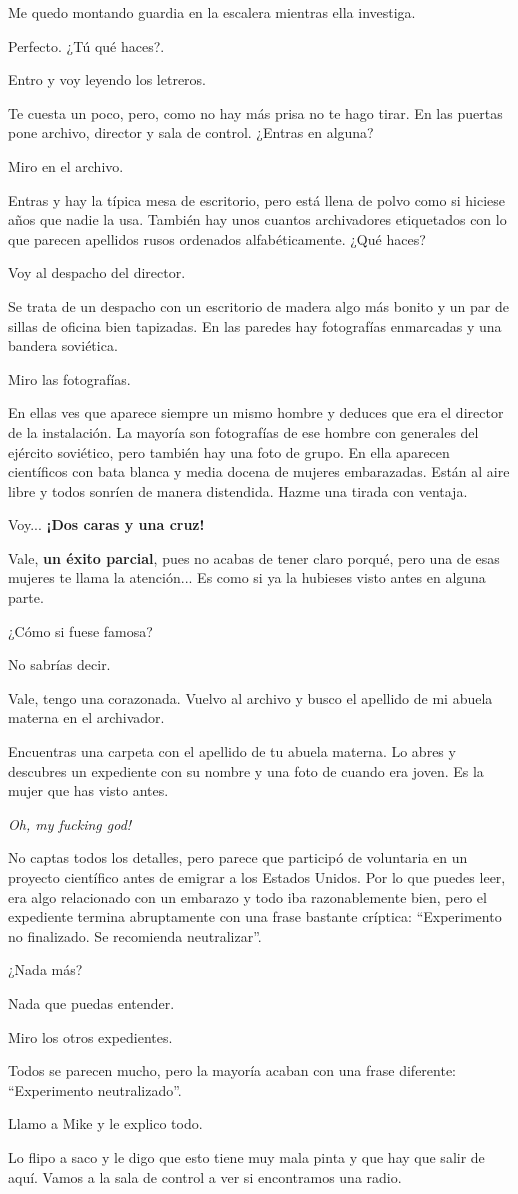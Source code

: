 \documentclass[10pt, a5paper, twocolumn]{article}
\newenvironment{dialogue}
    {\begin{description}[leftmargin=!,align=right,labelwidth=0.cm]}
    {\end{description}}
\newcommand\A{\item[\raisebox{-0.25em}{\scalebox{0.75}{\bctetraedre}}]}
\newcommand\B{\item[\raisebox{-0.25em}{\scalebox{0.75}{\bccube}}]}
\newcommand\E{\item[\raisebox{-0.25em}{\scalebox{0.75}{\bcicosaedre}}]}
\begin{document}
\begin{dialogue}
        \B Me quedo montando guardia en la escalera mientras ella investiga.
        \E Perfecto. ¿Tú qué haces?.
        \A Entro y voy leyendo los letreros.
        \E Te cuesta un poco, pero, como no hay más prisa no te hago tirar. En las puertas pone archivo, director y sala de control. ¿Entras en alguna?
        \A Miro en el archivo.
        \E Entras y hay la típica mesa de escritorio, pero está llena de polvo como si hiciese años que nadie la usa. También hay unos cuantos archivadores etiquetados con lo que parecen apellidos rusos ordenados alfabéticamente. ¿Qué haces?
        \A Voy al despacho del director.
        \E Se trata de un despacho con un escritorio de madera algo más bonito y un par de sillas de oficina bien tapizadas. En las paredes hay fotografías enmarcadas y una bandera soviética.
        \A Miro las fotografías.
        \E En ellas ves que aparece siempre un mismo hombre y deduces que era el director de la instalación. La mayoría son fotografías de ese hombre con generales del ejército soviético, pero también hay una foto de grupo. En ella aparecen científicos con bata blanca y media docena de mujeres embarazadas. Están al aire libre y todos sonríen de manera distendida. Hazme una tirada con ventaja.
        \A Voy... \textbf{¡Dos caras y una cruz!}
        \E Vale, \textbf{un éxito parcial}, pues no acabas de tener claro porqué, pero una de esas mujeres te llama la atención... Es como si ya la hubieses visto antes en alguna parte.
        \A ¿Cómo si fuese famosa?
        \E No sabrías decir.
        \A Vale, tengo una corazonada. Vuelvo al archivo y busco el apellido de mi abuela materna en el archivador.
        \E Encuentras una carpeta con el apellido de tu abuela materna. Lo abres y descubres un expediente con su nombre y una foto de cuando era joven. Es la mujer que has visto antes.
        \B \emph{Oh, my fucking god!}
        \E No captas todos los detalles, pero parece que participó de voluntaria en un proyecto científico antes de emigrar a los Estados Unidos. Por lo que puedes leer, era algo relacionado con un embarazo y todo iba razonablemente bien, pero el expediente termina abruptamente con una frase bastante críptica: ``Experimento no finalizado. Se recomienda neutralizar''.
        \A ¿Nada más?
        \E Nada que puedas entender.
        \A Miro los otros expedientes.
        \E Todos se parecen mucho, pero la mayoría acaban con una frase diferente: ``Experimento neutralizado''.
        \A Llamo a Mike y le explico todo.
        \B Lo flipo a saco y le digo que esto tiene muy mala pinta y que hay que salir de aquí. Vamos a la sala de control a ver si encontramos una radio.

\end{dialogue}
\end{document}
